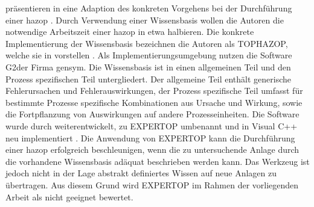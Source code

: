 \citeauthor{Khan_1997} pr\"asentieren in  eine Adaption des konkreten Vorgehens bei der Durchf\"uhrung einer \ac{hazop} \cite{Khan_1997}. Durch Verwendung einer Wissensbasis wollen die Autoren die notwendige Arbeitszeit einer \ac{hazop} in etwa halbieren. Die konkrete Implementierung der Wissensbasis bezeichnen die Autoren als TOPHAZOP, welche sie in  vorstellen \cite{Khan_1997a}. Als Implementierungsumgebung nutzen \citeauthor{Khan_1997a} die Software \glqq G2\grqq { }der Firma \glqq gensym\grqq { }. Die Wissensbasis ist in einen allgemeinen Teil und den Prozess spezifischen Teil untergliedert. Der allgemeine Teil enth\"alt generische Fehlerursachen und Fehlerauswirkungen, der Prozess spezifische Teil umfasst f\"ur bestimmte Prozesse spezifische Kombinationen aus Ursache und Wirkung, sowie die Fortpflanzung von Auswirkungen auf andere Prozesseinheiten. Die Software wurde durch \citeauthor{Khan_2000} weiterentwickelt, zu EXPERTOP umbenannt und in Visual C++ neu implementiert \cite{Khan_2000}. Die Anwendung von EXPERTOP kann die Durchf\"uhrung einer \ac{hazop} erfolgreich beschleunigen, wenn die zu untersuchende Anlage durch die vorhandene Wissensbasis ad\"aquat beschrieben werden kann. Das Werkzeug ist jedoch nicht in der Lage abstrakt definiertes Wissen auf neue Anlagen zu \"ubertragen. Aus diesem Grund wird EXPERTOP im Rahmen der vorliegenden Arbeit als nicht geeignet bewertet. 

